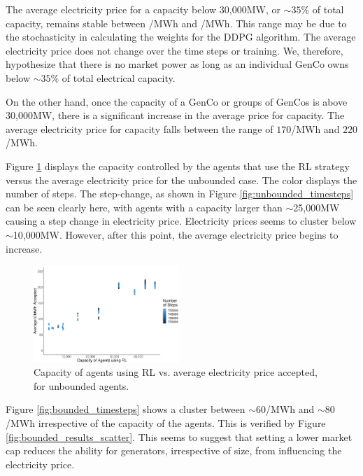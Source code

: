 \documentclass[conference]{IEEEtran}
\providecommand{\DIFaddbeginFL}{} %
\providecommand{\DIFaddendFL}{} %
\providecommand{\DIFdelbeginFL}{} %
\providecommand{\DIFdelendFL}{} %
\newcommand{\DIFscaledelfig}{0.5}
\newlength{\DIFdelgraphicswidth} %
\newlength{\DIFdelgraphicsheight} %
\newcommand{\DIFaddincludegraphics}[2][]{{\color{blue}\fbox{\DIFOincludegraphics[#1]{#2}}}} %
\newcommand{\DIFdelincludegraphics}[2][]{%
\sbox{\DIFdelgraphicsbox}{\DIFOincludegraphics[#1]{#2}}%
\settoboxwidth{\DIFdelgraphicswidth}{\DIFdelgraphicsbox} %
\settoboxtotalheight{\DIFdelgraphicsheight}{\DIFdelgraphicsbox} %
\scalebox{\DIFscaledelfig}{%
\parbox[b]{\DIFdelgraphicswidth}{\usebox{\DIFdelgraphicsbox}\\[-\baselineskip] \rule{\DIFdelgraphicswidth}{0em}}\llap{\resizebox{\DIFdelgraphicswidth}{\DIFdelgraphicsheight}{%
\setlength{\unitlength}{\DIFdelgraphicswidth}%
\begin{picture}(1,1)%
\thicklines\linethickness{2pt} %
{\color[rgb]{1,0,0}\put(0,0){\framebox(1,1){}}}%
{\color[rgb]{1,0,0}\put(0,0){\line( 1,1){1}}}%
{\color[rgb]{1,0,0}\put(0,1){\line(1,-1){1}}}%
\end{picture}%
}\hspace*{3pt}}} %
} %
\DeclareRobustCommand{\DIFaddbeginFL}{\DIFOaddbeginFL \let\includegraphics\DIFaddincludegraphics} %
\DeclareRobustCommand{\DIFaddendFL}{\DIFOaddendFL \let\includegraphics\DIFOincludegraphics} %
\DeclareRobustCommand{\DIFdelbeginFL}{\DIFOdelbeginFL \let\includegraphics\DIFdelincludegraphics} %
\DeclareRobustCommand{\DIFdelendFL}{\DIFOaddendFL \let\includegraphics\DIFOincludegraphics} %
\begin{document}
The average electricity price for a capacity below 30,000MW, or ${\sim35\%}$ of total capacity, remains stable between /MWh and /MWh. This range may be due to the stochasticity in calculating the weights for the DDPG algorithm. The average electricity price does not change over the time steps or training. We, therefore, hypothesize that there is no market power as long as an individual GenCo owns below ${\sim}35\%$ of total electrical capacity. 

On the other hand, once the capacity of a GenCo or groups of GenCos is above 30,000MW, there is a significant increase in the average price for capacity. The average electricity price for capacity falls between the range of  \textsterling$170$/MWh and \textsterling$220$/MWh. 

Figure \ref{fig:unbounded_results_scatter} displays the capacity controlled by the agents that use the RL strategy versus the average electricity price for the unbounded case. The color displays the number of steps. The step-change, as shown in Figure \ref{fig:unbounded_timesteps} can be seen clearly here, with agents with a capacity larger than ${\sim}$25,000MW causing a step change in electricity price. Electricity prices seems to cluster below ${\sim}$10,000MW. However, after this point, the average electricity price begins to increase.



\begin{figure}[]
	\centering
    \DIFdelbeginFL %
\DIFdelendFL \DIFaddbeginFL \includegraphics[width=0.49\textwidth]{figures/results/unbounded_results_scatter.pdf}
    \DIFaddendFL \caption{Capacity of agents using RL vs. average electricity price accepted, for unbounded agents.}
    \label{fig:unbounded_results_scatter}
\end{figure}


Figure \ref{fig:bounded_timesteps} shows a cluster between ${\sim}$\textsterling$60$/MWh and ${\sim}$\textsterling$80$/MWh irrespective of the capacity of the agents. This is verified by Figure \ref{fig:bounded_results_scatter}. This seems to suggest that setting a lower market cap reduces the ability for generators, irrespective of size, from influencing the electricity price.
\end{document}
